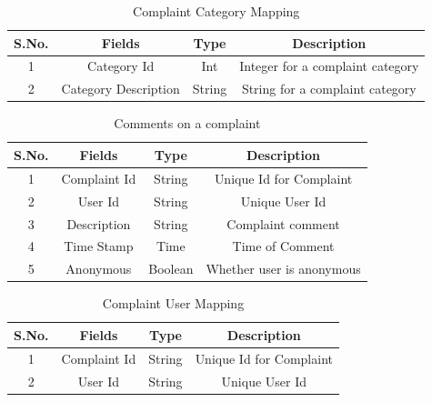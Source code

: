 \documentclass{article}
\begin{document}
\begin{table}[!htb]
\centering
\caption{Complaint Category Mapping}
\label{my-label}
\begin{tabular}{|c|c|c|c|}
\hline
\textbf{S.No.} & \textbf{Fields}      & \textbf{Type} & \textbf{Description}             \\ \hline
1              & Category Id          & Int           & Integer for a complaint category \\ \hline
2              & Category Description & String        & String for a complaint category  \\ \hline
\end{tabular}
\end{table}


\begin{table}[!htb]
\centering
\caption{Comments on a complaint}
\label{my-label}
\begin{tabular}{|c|c|c|c|}
\hline
\textbf{S.No.} & \textbf{Fields} & \textbf{Type} & \textbf{Description}    \\ \hline
1              & Complaint Id    & String        & Unique Id for Complaint \\ \hline
2              & User Id         & String        & Unique User Id          \\ \hline
3              & Description     & String        & Complaint comment       \\ \hline
4              & Time Stamp      & Time          & Time of Comment         \\ \hline
5              & Anonymous      & Boolean          & Whether user is anonymous         \\ \hline
\end{tabular}
\end{table}


\begin{table}[!htb]
\centering
\caption{Complaint User Mapping}
\label{my-label}
\begin{tabular}{|c|c|c|c|}
\hline
\textbf{S.No.} & \textbf{Fields} & \textbf{Type} & \textbf{Description}    \\ \hline
1              & Complaint Id    & String        & Unique Id for Complaint \\ \hline
2              & User Id         & String        & Unique User Id          \\ \hline
\end{tabular}
\end{table}
\end{document}
